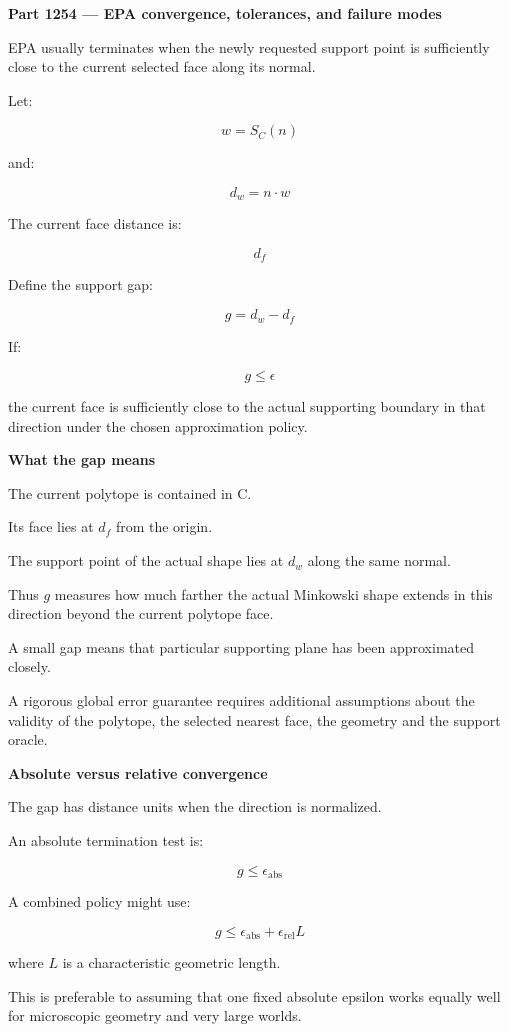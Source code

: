 \textbf{Part 1254 --- EPA convergence, tolerances, and failure modes}

EPA usually terminates when the newly requested support point is sufficiently close to the current selected face along its normal.

Let:

\[
w=S_C(n)
\]

and:

\[
d_w=n\cdot w
\]

The current face distance is:

\[
d_f
\]

Define the support gap:

\[
\boxed{ g=d_w-d_f }
\]

If:

\[
g\le\epsilon
\]

the current face is sufficiently close to the actual supporting boundary in that direction under the chosen approximation policy.

\textbf{What the gap means}

The current polytope is contained in C.

Its face lies at \(d_f\) from the origin.

The support point of the actual shape lies at \(d_w\) along the same normal.

Thus \(g\) measures how much farther the actual Minkowski shape extends in this direction beyond the current polytope face.

A small gap means that particular supporting plane has been approximated closely.

A rigorous global error guarantee requires additional assumptions about the validity of the polytope, the selected nearest face, the geometry and the support oracle.

\textbf{Absolute versus relative convergence}

The gap has distance units when the direction is normalized.

An absolute termination test is:

\[
g\le\epsilon_{\mathrm{abs}}
\]

A combined policy might use:

\[
\boxed{ g\le\epsilon_{\mathrm{abs}} + \epsilon_{\mathrm{rel}}L }
\]

where \(L\) is a characteristic geometric length.

This is preferable to assuming that one fixed absolute epsilon works equally well for microscopic geometry and very large worlds.

